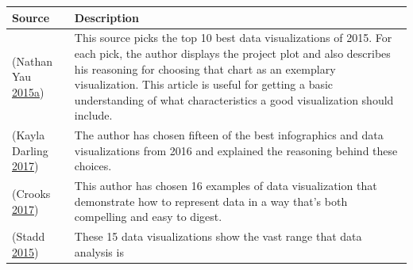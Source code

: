 \documentclass[]{book}
\theoremstyle{definition}
\theoremstyle{definition}
\theoremstyle{definition}
\theoremstyle{remark}
\begin{document}
\begin{longtable}[]{@{}ll@{}}
\toprule
\begin{minipage}[b]{0.15\columnwidth}\raggedright\strut
\textbf{Source}\strut
\end{minipage} & \begin{minipage}[b]{0.79\columnwidth}\raggedright\strut
\textbf{Description}\strut
\end{minipage}\tabularnewline
\midrule
\endhead
\begin{minipage}[t]{0.15\columnwidth}\raggedright\strut
(Nathan Yau
\protect\hyperlink{ref-10_best}{2015}\protect\hyperlink{ref-10_best}{a})\strut
\end{minipage} & \begin{minipage}[t]{0.79\columnwidth}\raggedright\strut
This source picks the top 10 best data visualizations of 2015. For each
pick, the author displays the project plot and also describes his
reasoning for choosing that chart as an exemplary visualization. This
article is useful for getting a basic understanding of what
characteristics a good visualization should include.\strut
\end{minipage}\tabularnewline
\begin{minipage}[t]{0.15\columnwidth}\raggedright\strut
(Kayla Darling \protect\hyperlink{ref-cool_data}{2017})\strut
\end{minipage} & \begin{minipage}[t]{0.79\columnwidth}\raggedright\strut
The author has chosen fifteen of the best infographics and data
visualizations from 2016 and explained the reasoning behind these
choices.\strut
\end{minipage}\tabularnewline
\begin{minipage}[t]{0.15\columnwidth}\raggedright\strut
(Crooks \protect\hyperlink{ref-int_viz_capt}{2017})\strut
\end{minipage} & \begin{minipage}[t]{0.79\columnwidth}\raggedright\strut
This author has chosen 16 examples of data visualization that
demonstrate how to represent data in a way that's both compelling and
easy to digest.\strut
\end{minipage}\tabularnewline
\begin{minipage}[t]{0.15\columnwidth}\raggedright\strut
(Stadd \protect\hyperlink{ref-15_mindblowing}{2015})\strut
\end{minipage} & \begin{minipage}[t]{0.79\columnwidth}\raggedright\strut
These 15 data visualizations show the vast range that data analysis is

\end{minipage}
\end{longtable}
\end{document}
